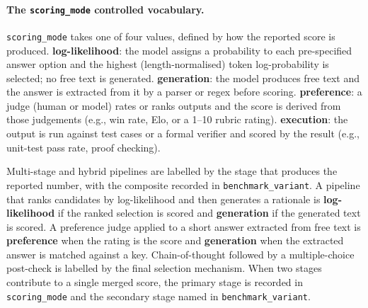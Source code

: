 \documentclass[11pt]{article}
\begin{document}
\paragraph{The \texttt{scoring\_mode} controlled vocabulary.}
\texttt{scoring\_mode} takes one of four values, defined by how the reported
score is produced. \textbf{log-likelihood}: the model assigns a probability to
each pre-specified answer option and the highest (length-normalised) token
log-probability is selected; no free text is generated. \textbf{generation}: the
model produces free text and the answer is extracted from it by a parser or
regex before scoring. \textbf{preference}: a judge (human or model) rates or
ranks outputs and the score is derived from those judgements (e.g., win rate,
Elo, or a 1--10 rubric rating). \textbf{execution}: the output is run against
test cases or a formal verifier and scored by the result (e.g., unit-test pass
rate, proof checking).

Multi-stage and hybrid pipelines are labelled by the stage that produces the
reported number, with the composite recorded in \texttt{benchmark\_variant}. A
pipeline that ranks candidates by log-likelihood and then generates a rationale
is \textbf{log-likelihood} if the ranked selection is scored and
\textbf{generation} if the generated text is scored. A preference judge applied
to a short answer extracted from free text is \textbf{preference} when the
rating is the score and \textbf{generation} when the extracted answer is matched
against a key. Chain-of-thought followed by a multiple-choice post-check is
labelled by the final selection mechanism. When two stages contribute to a
single merged score, the primary stage is recorded in \texttt{scoring\_mode} and
the secondary stage named in \texttt{benchmark\_variant}.
\end{document}
